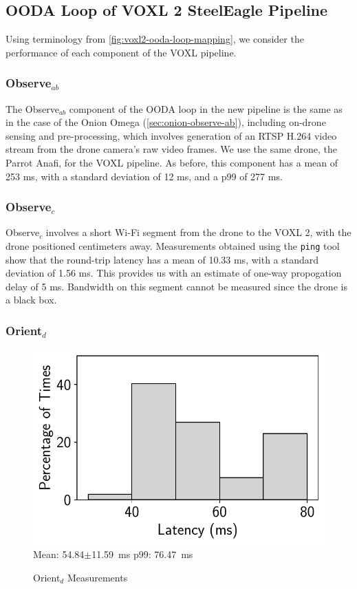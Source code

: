 \subsection{OODA Loop of VOXL 2 SteelEagle Pipeline}

Using terminology from \cref{fig:voxl2-ooda-loop-mapping}, we consider the
performance of each component of the VOXL pipeline.

\subsubsection*{Observe$_{ab}$}

The Observe$_{ab}$ component of the OODA loop in the new pipeline is the same as in
the case of the Onion Omega (\cref{sec:onion-observe-ab}), including on-drone
sensing and pre-processing, which involves generation of an RTSP H.264 video
stream from the drone camera's raw video frames. We use the same drone,
the Parrot Anafi, for the VOXL pipeline. As before, this component has a mean
of 253 ms, with a standard deviation of 12 ms, and a p99 of 277 ms.

\subsubsection*{Observe$_{c}$}

Observe$_c$ involves a short Wi-Fi segment from the drone to the VOXL 2, with
the drone positioned centimeters away.  Measurements obtained using the
\texttt{ping} tool show that the round-trip latency has a mean of 10.33 ms,
with a standard deviation of 1.56 ms. This provides us with an estimate of
one-way propogation delay of 5 ms. Bandwidth on this segment cannot be measured
since the drone is a black box.

\subsubsection*{Orient$_{d}$}

\begin{figure}[htb]
    \centering
    \includegraphics[width = .4\textwidth]{figs/voxl-decoding-time.pdf}\\
\small{Mean: 54.84$\pm$11.59~ms\; p99: 76.47~ms}\\
\caption{Orient$_d$ Measurements}
\label{fig:voxl2-decoding-latency}
\end{figure}

